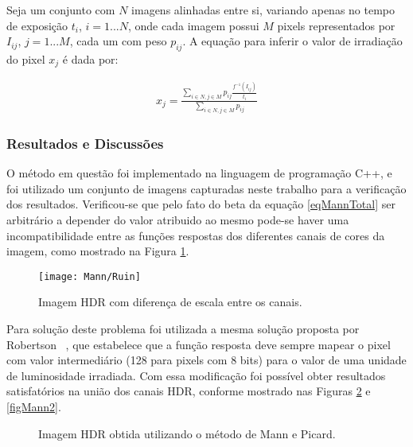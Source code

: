 Seja um conjunto com $N$ imagens alinhadas entre si, variando apenas no tempo de exposição $t_{i}$, $i = 1 ... N$, onde cada imagem possui $M$ pixels representados por $I_{ij}$, $j = 1... M$, cada um com peso $p_{ij}$. A equação para inferir o valor de irradiação do pixel $x_{j}$ é dada por:

\begin{align} \label{eqMannGeracao}
          x_{j} = \frac{\sum\limits_{i \in N, j \in M}{p_{ij}\frac{f^{-1}(I_{ij})}{t_{i}}}}{\sum\limits_{i \in N, j \in M}{p_{ij}}}
\end{align}

\subsubsection{Resultados e Discussões} \label{metodoMannResultado}

O método em questão foi implementado na linguagem de programação C++, e foi utilizado um conjunto de imagens capturadas neste trabalho para a verificação dos resultados. Verificou-se que pelo fato do beta da equação \ref{eqMannTotal} ser arbitrário  a depender do valor atribuido ao mesmo pode-se haver uma incompatibilidade entre as funções respostas dos diferentes canais de cores da imagem, como mostrado na Figura \ref{figMannFigErr}.

\begin{figure}[H]
  \centering
  \texttt{[image: Mann/Ruin]}
  \caption{Imagem HDR com diferença de escala entre os canais.}
  \label{figMannFigErr}
\end{figure}

Para solução deste problema foi utilizada a mesma solução proposta por Robertson \etal~\cite{robertson}, que estabelece que a função resposta deve sempre mapear o pixel com valor intermediário (128 para pixels com 8 bits) para o valor de uma unidade de luminosidade irradiada. Com essa modificação foi possível obter resultados satisfatórios na união dos canais HDR, conforme mostrado nas Figuras \ref{figMann1} e \ref{figMann2}.

\begin{figure}[H]
  \centering
  \quad %
  \caption{Imagem HDR obtida utilizando o método de Mann e Picard.}
  \label{figMann1}
\end{figure}

